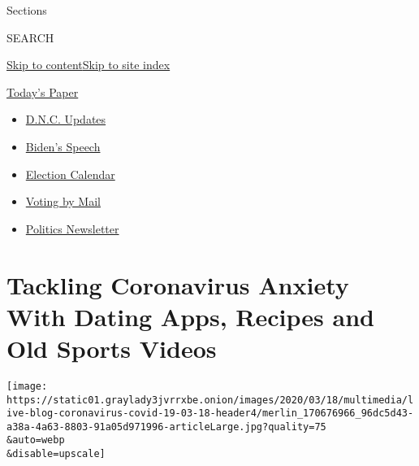 Sections

SEARCH

\protect\hyperlink{site-content}{Skip to
content}\protect\hyperlink{site-index}{Skip to site index}

\href{https://myaccount.nytimes3xbfgragh.onion/auth/login?response_type=cookie\&client_id=vi}{}

\href{https://www.nytimes3xbfgragh.onion/section/todayspaper}{Today's
Paper}

\begin{itemize}
\item
  \href{https://www.nytimes3xbfgragh.onion/live/2020/08/20/us/dnc-convention-election?action=click\&pgtype=Article\&state=default\&region=TOP_BANNER\&context=storylines_menu}{D.N.C.
  Updates}
\item
  \href{https://www.nytimes3xbfgragh.onion/2020/08/20/us/politics/biden-presidential-nomination-dnc.html?action=click\&pgtype=Article\&state=default\&region=TOP_BANNER\&context=storylines_menu}{Biden's
  Speech}
\item
  \href{https://www.nytimes3xbfgragh.onion/interactive/2019/us/elections/2020-presidential-election-calendar.html?action=click\&pgtype=Article\&state=default\&region=TOP_BANNER\&context=storylines_menu}{Election
  Calendar}
\item
  \href{https://www.nytimes3xbfgragh.onion/interactive/2020/08/11/us/politics/vote-by-mail-us-states.html?action=click\&pgtype=Article\&state=default\&region=TOP_BANNER\&context=storylines_menu}{Voting
  by Mail}
\item
  \href{https://www.nytimes3xbfgragh.onion/newsletters/politics?action=click\&pgtype=Article\&state=default\&region=TOP_BANNER\&context=storylines_menu}{Politics
  Newsletter}
\end{itemize}

\hypertarget{tackling-coronavirus-anxiety-with-dating-apps-recipes-and-old-sports-videos}{%
\section{Tackling Coronavirus Anxiety With Dating Apps, Recipes and Old
Sports
Videos}\label{tackling-coronavirus-anxiety-with-dating-apps-recipes-and-old-sports-videos}}

\texttt{[image: https://static01.graylady3jvrrxbe.onion/images/2020/03/18/multimedia/live-blog-coronavirus-covid-19-03-18-header4/merlin\_170676966\_96dc5d43-a38a-4a63-8803-91a05d971996-articleLarge.jpg?quality=75\\\&auto=webp\\\&disable=upscale]}

